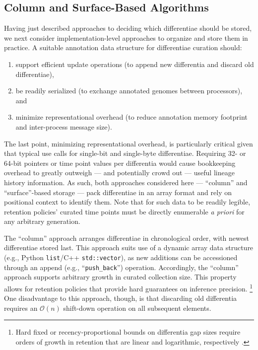 \subsection{Column and Surface-Based Algorithms}
\label{sec:methods-column-vs-surface-algorithms}

Having just described approaches to deciding which differentiae should be stored, we next consider implementation-level approaches to organize and store them in practice.
A suitable annotation data structure for differentiae curation should:
\begin{enumerate}
\item support efficient update operations (to append new differentia and discard old differentiae),
\item be readily serialized (to exchange annotated genomes between processors), and
\item minimize representational overhead (to reduce annotation memory footprint and inter-process message size).
\end{enumerate}

The last point, minimizing representational overhead, is particularly critical given that typical use calls for single-bit and single-byte differentiae.
Requiring 32- or 64-bit pointers or time point values per differentia would cause bookkeeping overhead to greatly outweigh --- and potentially crowd out --- useful lineage history information.
As such, both approaches considered here --- ``column'' and ``surface''-based storage --- pack differentiae in an array format and rely on positional context to identify them.
Note that for such data to be readily legible, retention policies' curated time points must be directly enumerable \textit{a priori} for any arbitrary generation.

The ``column'' approach arranges differentiae in chronological order, with newest differentiae stored last.
This approach suits use of a dynamic array data structure (e.g., Python \texttt{list}/C++ \texttt{std::vector}), as new additions can be accessioned through an append (e.g., ``\texttt{push\_back}'') operation.
Accordingly, the ``column'' approach supports arbitrary growth in curated collection size.
This property allows for retention policies that provide hard guarantees on inference precision.
\footnote{%
Hard fixed or recency-proportional bounds on differentia gap sizes require orders of growth in retention that are linear and logarithmic, respectively \citep{moreno2024algorithms}.
}
One disadvantage to this approach, though, is that discarding old differentia requires an $\mathcal{O}(n)$ shift-down operation on all subsequent elements.

